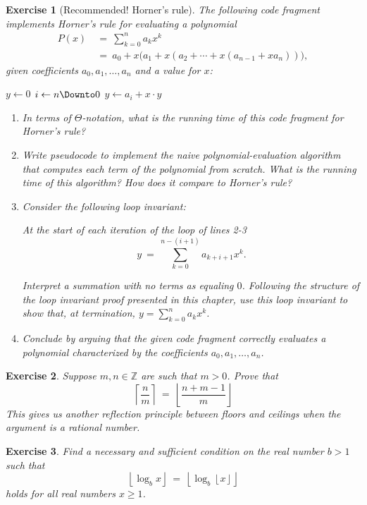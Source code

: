 \documentclass[11pt]{amsart}
\theoremstyle{theorem}
\newtheorem{exercise}{Exercise}
\newcommand\Z{\mathbb{Z}}
\newcommand{\floor}[1]{\left\lfloor #1 \right\rfloor}
\newcommand{\ceil}[1]{\left\lceil #1 \right\rceil}
\begin{document}
\begin{exercise}[Recommended! Horner's rule]
The following code fragment implements Horner's rule for evaluating a polynomial
\begin{align*}
P(x) \ &= \ \sum_{k=0}^na_kx^k \\
&= \ a_0+x\big(a_1+x(a_2+\cdots+x(a_{n-1}+xa_n))\big),
\end{align*}
given coefficients $a_0,a_1,\ldots,a_n$ and a value for $x$:
\begin{codebox}
\li $y\gets 0$
\li \For $i \gets n \Downto 0$
\li \Do
$y\gets a_i+x\cdot y$
\End
\end{codebox}
\begin{enumerate}
\item In terms of $\Theta$-notation, what is the running time of this code fragment for Horner's rule?
\item Write pseudocode to implement the naive polynomial-evaluation algorithm that computes each term of the polynomial from scratch. What is the running time of this algorithm? How does it compare to Horner's rule?
\item Consider the following loop invariant:
\begin{displayquote}
At the start of each iteration of the \For loop of lines 2-3
\[
y \ = \ \sum_{k=0}^{n-(i+1)}a_{k+i+1}x^k.
\]
\end{displayquote}
Interpret a summation with no terms as equaling $0$. Following the structure of the loop invariant proof presented in this chapter, use this loop invariant to show that, at termination, $y=\sum_{k=0}^na_kx^k$.
\item Conclude by arguing that the given code fragment correctly evaluates a polynomial characterized by the coefficients $a_0,a_1,\ldots,a_n$.
\end{enumerate}
\end{exercise}


\begin{exercise}
Suppose $m,n\in\Z$ are such that $m>0$. Prove that
\[
\ceil{\frac{n}{m}} \ = \ \floor{\frac{n+m-1}{m}}
\]
This gives us another \emph{reflection principle} between floors and ceilings when the argument is a rational number.
\end{exercise}


\begin{exercise}
Find a necessary and sufficient condition on the real number $b>1$ such that
\[
\floor{\log_bx} \ = \ \floor{\log_b\floor{x}}
\]
holds for all real numbers $x\geq 1$.
\end{exercise}
\end{document}
